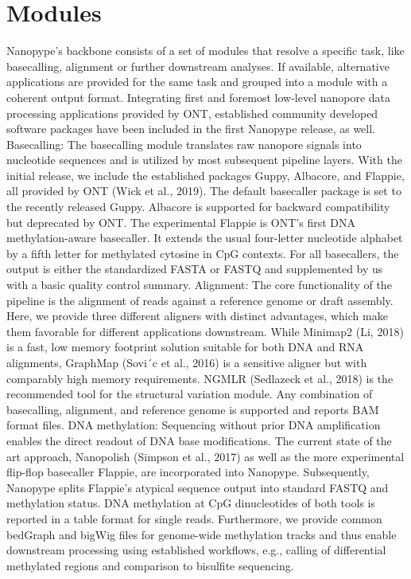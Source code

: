 \section{Modules}
\label{sec:nanopype:modules}
Nanopype’s backbone consists of a set of modules that resolve a specific task, like basecalling, alignment or further downstream analyses. If available, alternative applications are provided for the same task and grouped into a module with a coherent output format. Integrating first and foremost low-level nanopore data processing applications provided by ONT, established community developed software packages have been included in the first Nanopype release, as well.
Basecalling: The basecalling module translates raw nanopore signals into nucleotide sequences and is utilized by most subsequent pipeline layers. With the initial release, we include the established packages Guppy, Albacore, and Flappie, all provided by ONT (Wick et al., 2019). The default basecaller package is set to the recently released Guppy. Albacore is supported for backward compatibility but deprecated by ONT. The experimental Flappie is ONT’s first DNA methylation-aware basecaller. It extends the usual four-letter nucleotide alphabet by a fifth letter for methylated cytosine in CpG contexts. For all basecallers, the output is either the standardized FASTA or FASTQ and supplemented by us with a basic quality control summary.
Alignment: The core functionality of the pipeline is the alignment of reads against a reference genome or draft assembly. Here, we provide three different aligners with distinct advantages, which make them favorable for different applications downstream. While Minimap2 (Li, 2018) is a fast, low memory footprint solution suitable for both DNA and RNA alignments, GraphMap (Sovi´c et al., 2016) is a sensitive aligner but with comparably high memory requirements. NGMLR (Sedlazeck et al., 2018) is the recommended tool for the structural variation module. Any combination of basecalling, alignment, and reference genome is supported and reports BAM format files.
DNA methylation: Sequencing without prior DNA amplification enables the direct readout of DNA base modifications. The current state of the art approach, Nanopolish (Simpson et al., 2017) as well as the more experimental flip-flop basecaller Flappie, are incorporated into Nanopype. Subsequently, Nanopype splits Flappie’s atypical sequence output into standard FASTQ and methylation status. DNA methylation at CpG dinucleotides of both tools is reported in a table format for single reads. Furthermore, we provide common bedGraph and bigWig files for genome-wide methylation tracks and thus enable downstream processing using established workflows, e.g., calling of differential methylated regions and comparison to bisulfite sequencing.
